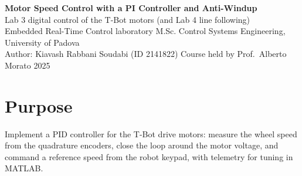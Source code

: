 \documentclass[10pt,a4paper]{article}
\begin{document}
\begin{center}
{\Large\bfseries Motor Speed Control with a PI Controller and Anti-Windup}\\[2pt]
{\large Lab 3 \textendash{} digital control of the T-Bot motors (and Lab 4 line following)}\\[4pt]
{\small Embedded Real-Time Control laboratory \textendash{} M.Sc. Control Systems Engineering, University of Padova}\\
{\small Author: Kiavash Rabbani Soudabi (ID 2141822) \textendash{} Course held by Prof.\ Alberto Morato \textendash{} 2025}
\end{center}

\section*{Purpose}
Implement a PID controller for the T-Bot drive motors: measure the wheel speed from the quadrature encoders, close
the loop around the motor voltage, and command a reference speed from the robot keypad, with telemetry for tuning in
MATLAB.
\end{document}
